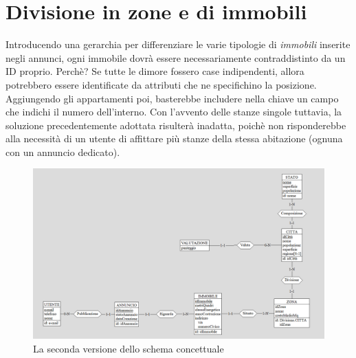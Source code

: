 \documentclass[a4paper,12pt]{report}
\begin{document}
        \section{Divisione in zone e di immobili}
        Introducendo una gerarchia per differenziare le varie tipologie di \textit{immobili} inserite negli annunci,
        ogni immobile dovrà essere necessariamente contraddistinto da un ID proprio. Perchè? Se tutte le dimore
        fossero case indipendenti, allora potrebbero essere identificate da attributi che ne specifichino la posizione.
        Aggiungendo gli appartamenti poi, basterebbe includere nella chiave un campo che indichi il numero dell'interno.
        Con l'avvento delle stanze singole tuttavia, la soluzione precedentemente adottata risulterà inadatta, poichè 
        non risponderebbe alla necessità di un utente di affittare più stanze della stessa abitazione (ognuna con un 
        annuncio dedicato).

        \begin{figure}[ht]
            \centering{}
            \includegraphics[width=\linewidth]{./images/second.png}
            \caption{La seconda versione dello schema concettuale}
        \end{figure}
\end{document}
